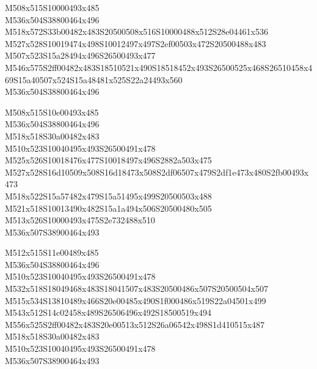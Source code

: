 \documentclass{article}
\begin{document}
\begin{multicols}{5}
\begin{center}

M508x515S10000493x485 %
\\M536x504S38800464x496 %
\\M518x572S33b00482x483S20500508x516S10000488x512S28e04461x536 %
\\M527x528S10019474x498S10012497x497S2ef00503x472S20500488x483 %
\\M507x523S15a28494x496S26500493x477 %
\\M546x575S2ff00482x483S18510521x490S18518452x493S26500525x468S26510458x469S15a40507x524S15a48481x525S22a24493x560 %
\\M536x504S38800464x496 %
\vfil
\columnbreak

M508x515S10e00493x485 %
\\M536x504S38800464x496 %
\\M518x518S30a00482x483 %
\\M510x523S10040495x493S26500491x478 %
\\M525x526S10018476x477S10018497x496S2882a503x475 %
\\M527x528S16d10509x508S16d18473x508S2df06507x479S2df1e473x480S2fb00493x473 %
\\M518x522S15a57482x479S15a51495x499S20500503x488 %
\\M521x518S10013490x482S15a1a494x506S20500480x505 %
\\M513x526S10000493x475S2e732488x510 %
\\M536x507S38900464x493 %
\vfil
\columnbreak

M512x515S11e00489x485 %
\\M536x504S38800464x496 %
\\M510x523S10040495x493S26500491x478 %
\\M532x518S18049468x483S18041507x483S20500486x507S20500504x507 %
\\M515x534S13810489x466S20e00485x490S1f000486x519S22a04501x499 %
\\M543x512S14c02458x489S26506496x492S18500519x494 %
\\M556x525S2ff00482x483S20e00513x512S26a06542x498S1d410515x487 %
\\M518x518S30a00482x483 %
\\M510x523S10040495x493S26500491x478 %
\\M536x507S38900464x493 %
\vfil
\columnbreak


\end{center}
\end{multicols}
\end{document}
